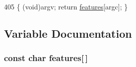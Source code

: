 \begin{DoxyCode}
405 \{ (void)argv; \textcolor{keywordflow}{return} \hyperlink{a00017_a1582568e32f689337602a16bf8a5bff0_a1582568e32f689337602a16bf8a5bff0}{features}[argc]; \}
\end{DoxyCode}


\subsection{Variable Documentation}
\subsubsection[{\texorpdfstring{features}{features}}]{\setlength{\rightskip}{0pt plus 5cm}const char features\mbox{[}$\,$\mbox{]}}\hypertarget{a00017_a1582568e32f689337602a16bf8a5bff0_a1582568e32f689337602a16bf8a5bff0}{}\label{a00017_a1582568e32f689337602a16bf8a5bff0_a1582568e32f689337602a16bf8a5bff0}
